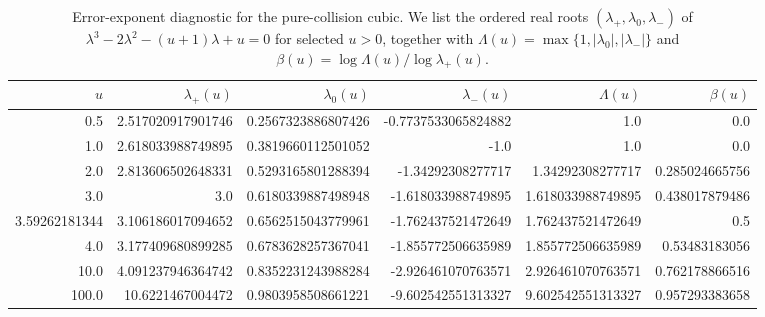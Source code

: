 \begin{table}[H]
\centering
\scriptsize
\setlength{\tabcolsep}{6pt}
\caption{Error-exponent diagnostic for the pure-collision cubic. We list the ordered real roots $(\lambda_+,\lambda_0,\lambda_-)$ of $\lambda^3-2\lambda^2-(u+1)\lambda+u=0$ for selected $u>0$, together with $\Lambda(u)=\max\{1,|\lambda_0|,|\lambda_-|\}$ and $\beta(u)=\log\Lambda(u)/\log\lambda_+(u)$.}
\label{tab:arity_pure_collision_cubic_rh_threshold_beta}
\begin{tabular}{r r r r r r}
\toprule
$u$ & $\lambda_+(u)$ & $\lambda_0(u)$ & $\lambda_-(u)$ & $\Lambda(u)$ & $\beta(u)$\\
\midrule
0.5 & 2.517020917901746 & 0.2567323886807426 & -0.7737533065824882 & 1.0 & 0.0\\
1.0 & 2.618033988749895 & 0.3819660112501052 & -1.0 & 1.0 & 0.0\\
2.0 & 2.813606502648331 & 0.5293165801288394 & -1.34292308277717 & 1.34292308277717 & 0.285024665756\\
3.0 & 3.0 & 0.6180339887498948 & -1.618033988749895 & 1.618033988749895 & 0.438017879486\\
3.59262181344 & 3.106186017094652 & 0.6562515043779961 & -1.762437521472649 & 1.762437521472649 & 0.5\\
4.0 & 3.177409680899285 & 0.6783628257367041 & -1.855772506635989 & 1.855772506635989 & 0.53483183056\\
10.0 & 4.091237946364742 & 0.8352231243988284 & -2.926461070763571 & 2.926461070763571 & 0.762178866516\\
100.0 & 10.6221467004472 & 0.9803958508661221 & -9.602542551313327 & 9.602542551313327 & 0.957293383658\\
\bottomrule
\end{tabular}
\end{table}
